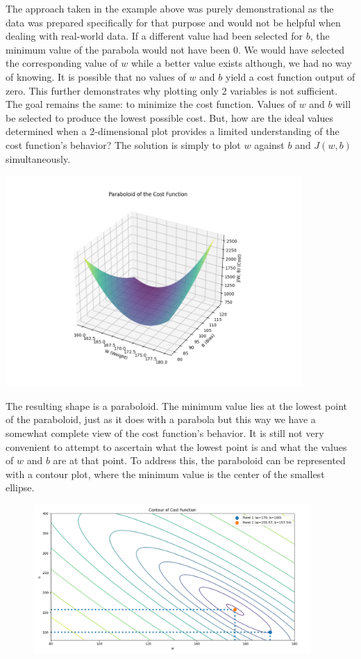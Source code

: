 \documentclass{article}
\begin{document}
The approach taken in the example above was purely demonstrational as the data was prepared specifically for that purpose and would not be helpful when dealing with real-world data. If a different value had been selected for $b$, the minimum value of the parabola would not have been 0. We would have selected the corresponding value of $w$ while a better value exists although, we had no way of knowing. It is possible that no values of $w$ and $b$ yield a cost function output of zero. This further demonstrates why plotting only 2 variables is not sufficient. The goal remains the same: to minimize the cost function. Values of $w$ and $b$ will be selected to produce the lowest possible cost. But, how are the ideal values determined when a 2-dimensional plot provides a limited understanding of the cost function's behavior? The solution is simply to plot $w$ against $b$ and $J(w, b)$ simultaneously.

\includegraphics[width=320pt]{images/paraboloid.png}

\noindent The resulting shape is a paraboloid. The minimum value lies at the lowest point of the paraboloid, just as it does with a parabola but this way we have a somewhat complete view of the cost function's behavior. It is still not very convenient to attempt to ascertain what the lowest point is and what the values of $w$ and $b$ are at that point. To address this, the paraboloid can be represented with a contour plot, where the minimum value is the center of the smallest ellipse.

\begin{figure}[h!]
\centering
\includegraphics[width=300pt]{images/contour.png}
\end{figure}
\end{document}
